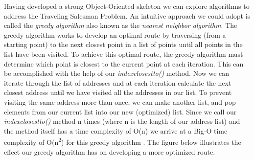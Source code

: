 \documentclass[letterpaper]{article}
\begin{document}
    Having developed a strong Object-Oriented skeleton we can 
    explore algorithms to address the Traveling Salesman Problem. 
    An intuitive approach we could adopt is called the 
    \emph{greedy algorithm} also known as the \emph{nearest neighbor algorithm}. \cite[p.~458]{cite:eijkhout2022}  
    The greedy algorithm works to develop an optimal route by traversing (from a starting point)  
    to the next closest point in a list of points until all points in the list have been visited.
    To achieve this optimal route, the greedy algorithm must 
    determine which point is closest to the current point at each iteration.
    This can be accomplished with the help of our \emph{index\textunderscore closest\textunderscore to()}
    method. Now we can iterate through the list of addresses 
    and at each iteration calculate the next closest address 
    until we have visited all the addresses in our list. To 
    prevent visiting the same address more than once, we can 
    make another list, and pop elements from our current list 
    into our new (optimized) list. Since we call our 
    \emph{index\textunderscore closest\textunderscore to()} 
    method n times (where n is the length of our address list) 
    and the method itself has a time complexity of O(n) we 
    arrive at a Big-O time complexity of O(n\textsuperscript{2}) for this 
    greedy algorithm . The figure below illustrates the 
    effect our greedy algorithm has on developing a more 
    optimized route. 
\end{document}
